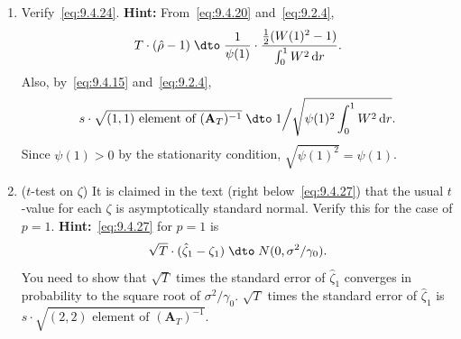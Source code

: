 \begin{enumerate}
\item Verify~\eqref{eq:9.4.24}. \textbf{Hint:} From~\eqref{eq:9.4.20} and~\eqref{eq:9.2.4},
\[
T \cdot (\hat{\rho} - 1) \;\dto\;
\frac{1}{\psi(1)} \cdot \frac{\tfrac{1}{2}(W(1)^2 - 1)}{\int_0^1 W^2\,\mathrm{d}r}.
\]
Also, by~\eqref{eq:9.4.15} and~\eqref{eq:9.2.4},
\begin{equation}
\label{eq:9.4.41}
s \cdot \sqrt{(1,1) \text{ element of } (\mathbf{A}_T)^{-1}}
\;\dto\; 1 \Big/ \sqrt{\psi(1)^2 \int_0^1 W^2\,\mathrm{d}r}.
\end{equation}
Since $\psi(1) > 0$ by the stationarity condition, $\sqrt{\psi(1)^2} = \psi(1)$.

\item ($t$-test on $\zeta$) \enspace It is claimed in the text (right below~\eqref{eq:9.4.27}) that the usual $t$-value for each $\zeta$ is asymptotically standard normal. Verify this for the case of
$p = 1$. \textbf{Hint:}~\eqref{eq:9.4.27} for $p = 1$ is
\[
\sqrt{T} \cdot (\hat{\zeta}_1 - \zeta_1) \;\dto\; N(0, \sigma^2/\gamma_0).
\]
You need to show that $\sqrt{T}$ times the standard error of $\hat{\zeta}_1$ converges in probability to the square root of $\sigma^2/\gamma_0$. $\sqrt{T}$ times the standard error of $\hat{\zeta}_1$ is $s \cdot
\sqrt{(2, 2) \text{ element of } (\mathbf{A}_T)^{-1}}$.
\end{enumerate}
